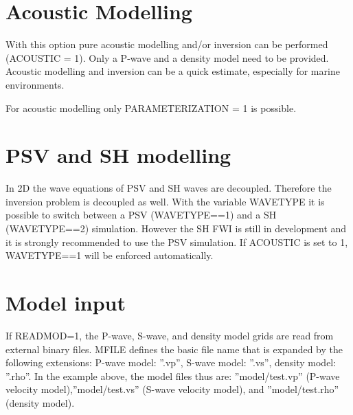 \newpage


\section{Acoustic Modelling}
\label{ac_mod}
{\color{blue}{\begin{verbatim}
"Acoustic Computation" : "comment",
			"ACOUSTIC" : "1",
\end{verbatim}}}

{\color{red}{\begin{verbatim}
Default value is:
	ACOUSTIC=0
\end{verbatim}}}

With this option pure acoustic modelling and/or inversion can be performed (ACOUSTIC = 1). Only a P-wave and a density model need to be provided. Acoustic modelling and inversion can be a quick estimate, especially for marine environments.

For acoustic modelling only PARAMETERIZATION = 1 is possible.

\section{PSV and SH modelling}
{\color{blue}{\begin{verbatim}
			"WAVETYPE" : "1",
\end{verbatim}}}

{\color{red}{\begin{verbatim}
Default value is:
	WAVETYPE=1
\end{verbatim}}}
In 2D the wave equations of PSV and SH waves are decoupled. Therefore the inversion problem is decoupled as well. With the variable WAVETYPE it is possible to switch between a PSV (WAVETYPE==1) and a SH (WAVETYPE==2) simulation. However the SH FWI is still in development and it is strongly recommended to use the PSV simulation. If ACOUSTIC is set to 1, WAVETYPE==1 will be enforced automatically.

\section{Model input}
\label{gen_of_mod}
{\color{blue}{\begin{verbatim}
"Model" : "comment",
			"READMOD" : "0",
			"MFILE" : "model/test",
\end{verbatim}}}

If READMOD=1, the P-wave, S-wave, and density model grids are read from external binary files. MFILE defines the basic file name that is expanded by the following extensions: P-wave model: ''.vp'', S-wave model: ''.vs'', density model: ''.rho''.  In the example above, the model files thus are: ''model/test.vp'' (P-wave velocity model),''model/test.vs'' (S-wave velocity model), and ''model/test.rho'' (density model). 

